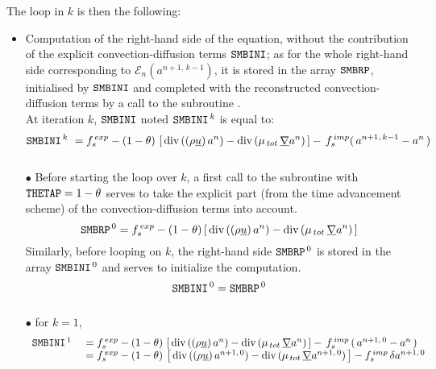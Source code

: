 The loop in $k$ is then the following:
\begin{itemize}
\item Computation of the right-hand side of the equation, without the contribution of
the explicit convection-diffusion terms $\text{\texttt{SMBINI}}$; as for the whole right-hand side corresponding
to $\mathcal{E}_{n}(a^{n+1,\,k-1})$, it is stored in the array $\text{\texttt{SMBRP}}$,
initialised by $\text{\texttt{SMBINI}}$ and completed with the reconstructed
convection-diffusion terms by a call to the subroutine .\\
At iteration $k$, $\text{\texttt{SMBINI}}$ noted  $\text{\texttt{SMBINI}}^{\,k}$ is equal to:\\
\begin{equation}\notag
\text{\texttt{SMBINI}}^{\,k}\  = f_s^{\,exp}-(1-\theta)\,\left[\,\text{div}\,((\rho \underline{u})\,a^n) - \text{div}\,(\mu_{\,tot}\,\underline{\nabla} a^n)\,\right]-\,f_s^{\,imp}(\,a^{n+1,\,k-1} - a^n\,) \\
\end{equation}
\\
$\bullet$ Before starting the loop over $k$, a first call to the subroutine  with $\text{\texttt{THETAP}}=1-\theta$ serves to take the explicit part (from the time advancement scheme) of the convection-diffusion terms into account.
\begin{equation}\notag
\displaystyle
\text{\texttt{SMBRP}}^{\,0} = f_s^{\,exp} -(1-\theta)\,[\,\text{div}\,((\rho \underline{u})\,a^n) - \text{div}\,(\mu_{\,tot}\,\underline{\nabla} a^n)\,]\\
\end{equation}
Similarly, before looping on $k$, the right-hand side $\text{\texttt{SMBRP}}^{\,0}$ is stored in the array $\text{\texttt{SMBINI}}^{\,0}$ and serves to initialize the computation.
\begin{equation}\notag
\text{\texttt{SMBINI}}^{\,0} =\text{\texttt{SMBRP}}^{\,0}
\end{equation}
\\
$\bullet$ for $k = 1$,
\begin{equation}\notag
\begin{array}{ll}
\text{\texttt{SMBINI}}^{\,1}\ &=f_s^{\,exp}-(1-\theta)\,\left[\,\text{div}\,((\rho \underline{u})\,a^n) - \text{div}\,(\mu_{\,tot}\,\underline{\nabla} a^n)\,\right]-\,f_s^{\,imp}\,(\,a^{n+1,\,0} - a^n\,)\\
&=f_s^{\,exp}- (1-\theta)\,\left[\,\text{div}\,((\rho \underline{u})\,a^{n+1,\,0}) - \text{div}\,(\mu_{\,tot}\,\underline{\nabla} a^{n+1,\,0})\,\right]-f_s^{\,imp}\,\delta a^{n+1,\,0} \\
\end{array}
\end{equation}

\end{itemize}
